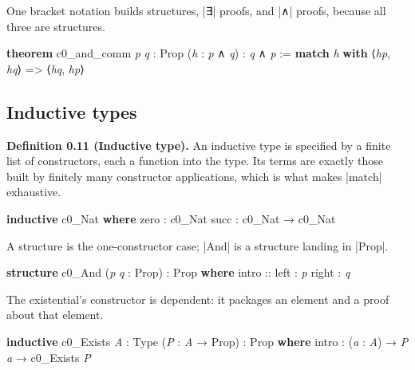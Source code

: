 \documentclass{memoir}
\begin{document}
One bracket notation builds structures, \LeanVerb|∃| proofs, and \LeanVerb|∧| proofs, because all
three are structures.

\begin{LeanVerbatim}
\textbf{theorem} c0_and_comm \textit{p} \textit{q} : Prop (\textit{h} : \textit{p} ∧ \textit{q}) : \textit{q} ∧ \textit{p} :=
  \textbf{match} \textit{h} \textbf{with}
   ⟨\textit{hp}, \textit{hq}⟩ => ⟨\textit{hq}, \textit{hp}⟩

\end{LeanVerbatim}




\subsection{Inductive types}\label{Two--Schemas--of--Impossibility-005F-005F-005F--Machine--Checked--Limits--of--Trustworthy--Machine--Learning-005F-005F-005F--and--Why--They--Tighten--with--Capability----Preliminaries----How--to--read--the--Lean--4----Inductive--types}

\textbf{Definition 0.11 (Inductive type).} An inductive type is specified by a finite
list of constructors, each a function into the type. Its terms are exactly those
built by finitely many constructor applications, which is what makes \LeanVerb|match|
exhaustive.

\begin{LeanVerbatim}
\textbf{inductive} c0_Nat \textbf{where}
   zero : c0_Nat
   succ : c0_Nat → c0_Nat

\end{LeanVerbatim}


A structure is the one-constructor case; \LeanVerb|And| is a structure landing in \LeanVerb|Prop|.

\begin{LeanVerbatim}
\textbf{structure} c0_And (\textit{p} \textit{q} : Prop) : Prop \textbf{where}
  intro ::
  left : \textit{p}
  right : \textit{q}

\end{LeanVerbatim}


The existential's constructor is dependent: it packages an element and a proof
about that element.

\begin{LeanVerbatim}
\textbf{inductive} c0_Exists \textit{A} : Type (\textit{P} : \textit{A} → Prop) : Prop \textbf{where}
   intro : (\textit{a} : \textit{A}) → \textit{P} \textit{a} → c0_Exists \textit{P}

\end{LeanVerbatim}
\end{document}
